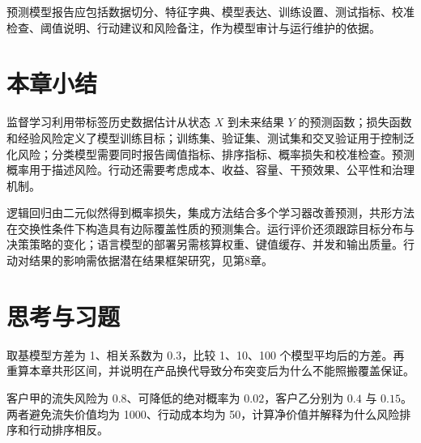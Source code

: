 预测模型报告应包括数据切分、特征字典、模型表达、训练设置、测试指标、校准检查、阈值说明、行动建议和风险备注，作为模型审计与运行维护的依据。

\section*{本章小结}

监督学习利用带标签历史数据估计从状态 \(X\) 到未来结果 \(Y\) 的预测函数；损失函数和经验风险定义了模型训练目标；训练集、验证集、测试集和交叉验证用于控制泛化风险；分类模型需要同时报告阈值指标、排序指标、概率损失和校准检查。预测概率用于描述风险。行动还需要考虑成本、收益、容量、干预效果、公平性和治理机制。

逻辑回归由二元似然得到概率损失，集成方法结合多个学习器改善预测，共形方法在交换性条件下构造具有边际覆盖性质的预测集合。运行评价还须跟踪目标分布与决策策略的变化；语言模型的部署另需核算权重、键值缓存、并发和输出质量。行动对结果的影响需依据潜在结果框架研究，见第8章。


\section*{思考与习题}

\begin{exercise}[集成与区间]
取基模型方差为 1、相关系数为 0.3，比较 1、10、100 个模型平均后的方差。再重算本章共形区间，并说明在产品换代导致分布突变后为什么不能照搬覆盖保证。
\end{exercise}
\begin{exercise}[风险与效果]
客户甲的流失风险为 \(0.8\)、可降低的绝对概率为 \(0.02\)，客户乙分别为 \(0.4\) 与 \(0.15\)。两者避免流失价值均为 1000、行动成本均为 50，计算净价值并解释为什么风险排序和行动排序相反。
\end{exercise}

